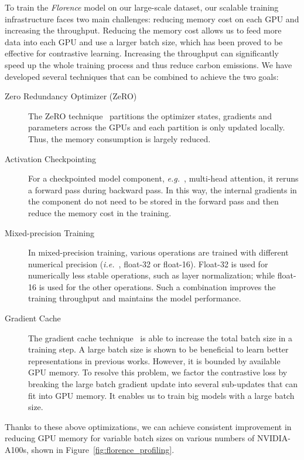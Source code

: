 \documentclass{article}
\newcommand{\eg}{{\it{e.g.}~}}
\newcommand{\ie}{{\it{i.e.}~}}
\begin{document}
To train the \emph{Florence} model on our large-scale dataset, our scalable training infrastructure
faces two main challenges: reducing memory cost on each GPU and increasing the throughput. Reducing
the memory cost allows us to feed more data into each GPU and use a larger batch size, which has
been proved to be effective for contrastive learning.
Increasing the throughput can significantly speed up the whole training process and thus reduce
carbon emissions. We have developed several techniques that can be combined to achieve the two
goals:

\begin{description}
  \item[Zero Redundancy Optimizer (ZeRO)] The ZeRO
      technique~\cite{DBLP:journals/corr/abs-1910-02054} partitions the optimizer states,
      gradients and parameters across the GPUs and each partition is only updated locally. Thus,
      the memory consumption is largely reduced.
  \item[Activation Checkpointing] For a checkpointed model component, \eg, multi-head attention,
      it reruns a forward pass during backward pass. In this way, the internal gradients in the
      component do not need to be stored in the forward pass and then reduce the memory cost in
      the training.
  \item[Mixed-precision Training] In mixed-precision training, various operations are trained with
      different numerical precision (\ie, float-32 or float-16). Float-32 is used for numerically
      less stable operations, such as layer normalization; while float-16 is used for the other
      operations. Such a combination improves the training throughput and maintains the model
      performance.
  \item[Gradient Cache] The gradient cache technique~\cite{gao2021scaling} is able to increase the
      total batch size in a training step. A large batch size is shown to be beneficial to learn better
      representations in previous works. However, it is bounded by available GPU memory. To
      resolve this problem, we factor the contrastive loss by breaking the large batch gradient
      update into several sub-updates that can fit into GPU memory. It enables us to train big
      models with a large batch size.
\end{description}

Thanks to these above optimizations, we can achieve consistent improvement in reducing GPU memory for variable batch sizes on various numbers of NVIDIA-A100s, shown in Figure~\ref{fig:florence_profiling}.
\end{document}
